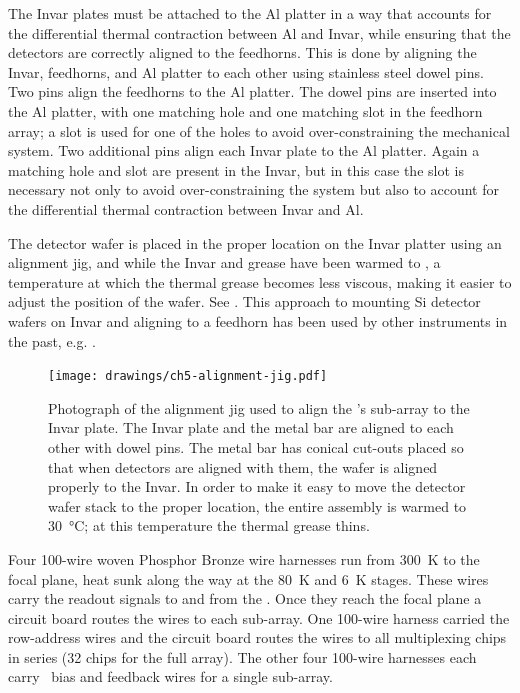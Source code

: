 The Invar plates must be attached to the Al platter in a way that accounts for the differential thermal contraction between Al and Invar, while ensuring that the detectors are correctly aligned to the feedhorns.
This is done by aligning the Invar, feedhorns, and Al platter to each other using stainless steel dowel pins.
Two pins align the feedhorns to the Al platter.
The dowel pins are inserted into the Al platter, with one matching hole and one matching slot in the feedhorn array; a slot is used for one of the holes to avoid over-constraining the mechanical system.
Two additional pins align each Invar plate to the Al platter.
Again a matching hole and slot are present in the Invar, but in this case the slot is necessary not only to avoid over-constraining the system but also to account for the differential thermal contraction between Invar and Al.

The detector wafer is placed in the proper location on the Invar platter using an alignment jig, and while the Invar and grease have been warmed to , a temperature at which the thermal grease becomes less viscous, making it easier to adjust the position of the wafer.
See .
This approach to mounting Si detector wafers on Invar and aligning to a feedhorn has been used by other instruments in the past, e.g. \cite{schwan_invited_2011}.

\begin{figure}
\centering
\texttt{[image: drawings/ch5-alignment-jig.pdf]}
\caption[Alignment jig]{
  Photograph of the alignment jig used to align the \Imager's sub-array to the Invar plate.
  The Invar plate and the metal bar are aligned to each other with dowel pins.
  The metal bar has conical cut-outs placed so that when detectors are aligned with them, the wafer is aligned properly to the Invar.
  In order to make it easy to move the detector wafer stack to the proper location, the entire assembly is warmed to \SI{30}{\celsius}; at this temperature the thermal grease thins.
}
\label{fig:ch5-alignment-jig}
\end{figure}

Four 100-wire woven Phosphor Bronze wire harnesses run from \SI{300}{\K} to the focal plane, heat sunk along the way at the \SI{80}{\K} and \SI{6}{\K} stages.
These wires carry the readout signals to and from the \MCE.
Once they reach the focal plane a circuit board routes the wires to each sub-array.
One 100-wire harness carried the row-address wires and the circuit board routes the wires to all multiplexing chips in series (32 chips for the full array).
The other four 100-wire harnesses each carry \SQUID\ bias and feedback wires for a single sub-array.


